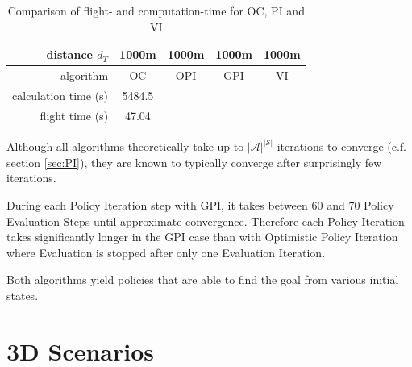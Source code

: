 \begin{table}[h]
	\begin{center}
		\begin{tabular}{r|c c c c}
			distance $d_T$ & 1000m & 1000m & 1000m & 1000m \\ \hline 
			algorithm & OC & OPI & GPI & VI \\
			calculation time (s) & 5484.5& & & \\
			flight time (s) & 47.04 & & &
		\end{tabular}
		\caption{Comparison of flight- and computation-time for OC, PI and VI}
		\label{tab:2d_flighttimes}
	\end{center}
\end{table}

Although all algorithms theoretically take up to $|\mathcal{A}|^{|\mathcal{S}|}$ iterations to converge (c.f. section \ref{sec:PI}), they are known to typically converge after surprisingly few iterations.

During each Policy Iteration step with GPI, it takes between 60 and 70 Policy Evaluation Steps until approximate convergence. Therefore each Policy Iteration takes significantly longer in the GPI case than with Optimistic Policy Iteration where Evaluation is stopped after only one Evaluation Iteration.

Both algorithms yield policies that are able to find the goal from various initial states. 

\section{3D Scenarios}
